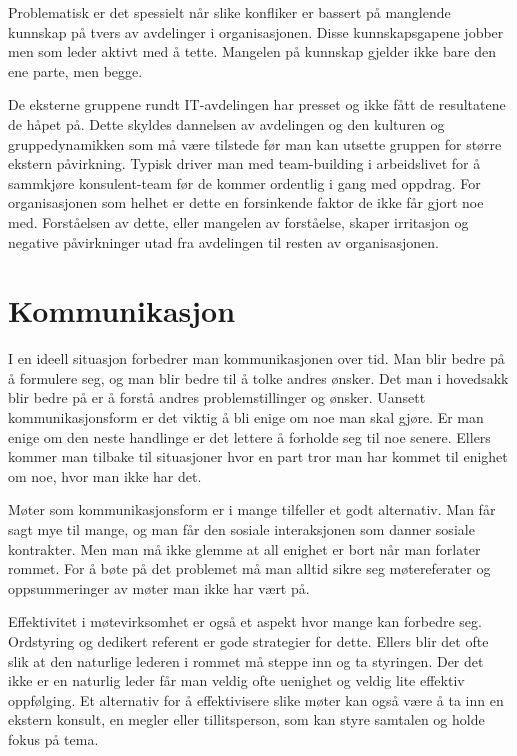 \documentclass[12pt, a4paper]{article}
\begin{document}
Problematisk er det spessielt når slike konfliker er bassert på manglende
kunnskap på tvers av avdelinger i organisasjonen. Disse kunnskapsgapene jobber
men som leder aktivt med å tette. Mangelen på kunnskap gjelder ikke bare den
ene parte, men begge.  

De eksterne gruppene rundt IT-avdelingen har presset og ikke fått de
resultatene de håpet på. Dette skyldes dannelsen av avdelingen og den kulturen
og gruppedynamikken som må være tilstede før man kan utsette gruppen for større
ekstern påvirkning. Typisk driver man med team-building i arbeidslivet for å
sammkjøre konsulent-team før de kommer ordentlig i gang med oppdrag. For
organisasjonen som helhet er dette en forsinkende faktor de ikke får gjort noe
med. Forståelsen av dette, eller mangelen av forståelse, skaper irritasjon og
negative påvirkninger utad fra avdelingen til resten av organisasjonen.     

\section{Kommunikasjon}

I en ideell situasjon forbedrer man kommunikasjonen over tid. Man blir bedre på
å formulere seg, og man blir bedre til å tolke andres ønsker. Det man i
hovedsakk blir bedre på er å forstå andres problemstillinger og ønsker. Uansett
kommunikasjonsform er det viktig å bli enige om noe man skal gjøre. Er man
enige om den neste handlinge er det lettere å forholde seg til noe senere.
Ellers kommer man tilbake til situasjoner hvor en part tror man har kommet til
enighet om noe, hvor man ikke har det.

Møter som kommunikasjonsform er i mange tilfeller et godt alternativ. Man får
sagt mye til mange, og man får den sosiale interaksjonen som danner sosiale
kontrakter. Men man må ikke glemme at all enighet er bort når man forlater
rommet. For å bøte på det problemet må man alltid sikre seg møtereferater og
oppsummeringer av møter man ikke har vært på.

Effektivitet i møtevirksomhet er også et aspekt hvor mange kan forbedre seg.
Ordstyring og dedikert referent er gode strategier for dette. Ellers blir det
ofte slik at den naturlige lederen i rommet må steppe inn og ta styringen. Der
det ikke er en naturlig leder får man veldig ofte uenighet og veldig lite
effektiv oppfølging. Et alternativ for å effektivisere slike møter kan også
være å ta inn en ekstern konsult, en megler eller tillitsperson, som kan styre
samtalen og holde fokus på tema.
\end{document}
